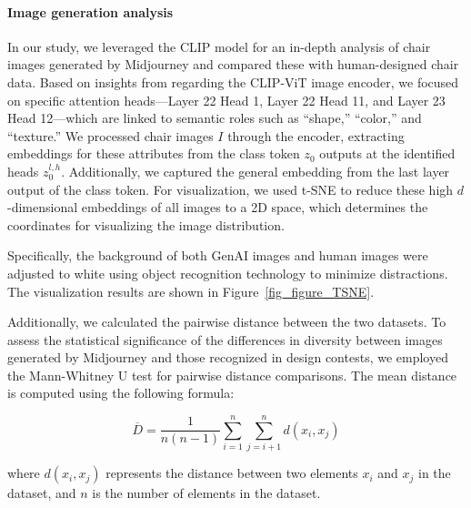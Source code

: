 \paragraph{\textbf{Image generation analysis}}
In our study, we leveraged the CLIP model for an in-depth analysis of chair images generated by Midjourney and compared these with human-designed chair data. Based on insights from \cite{gandelsman2023interpreting} regarding the CLIP-ViT image encoder, we focused on specific attention heads—Layer 22 Head 1, Layer 22 Head 11, and Layer 23 Head 12—which are linked to semantic roles such as “shape,” “color,” and “texture.” We processed chair images \(I\) through the encoder, extracting embeddings for these attributes from the class token \(z_0\) outputs at the identified heads \(z_0^{l,h}\). Additionally, we captured the general embedding from the last layer output of the class token. For visualization, we used t-SNE \cite{van2008visualizing} to reduce these high \(d\)-dimensional embeddings of all images to a 2D space, which determines the coordinates for visualizing the image distribution.

Specifically, the background of both GenAI images and human images were adjusted to white using object recognition technology to minimize distractions. The visualization results are shown in Figure~\ref{fig_figure_TSNE}.

Additionally, we calculated the pairwise distance between the two datasets. To assess the statistical significance of the differences in diversity between images generated by Midjourney and those recognized in design contests, we employed the Mann-Whitney U test for pairwise distance comparisons. The mean distance is computed using the following formula:

\begin{equation}
\overline{D} = \frac{1}{n(n-1)} \sum_{i=1}^{n} \sum_{j=i+1}^{n} d(x_i, x_j)
\end{equation}

where \(d(x_i, x_j)\) represents the distance between two elements \(x_i\) and \(x_j\) in the dataset, and \(n\) is the number of elements in the dataset.




